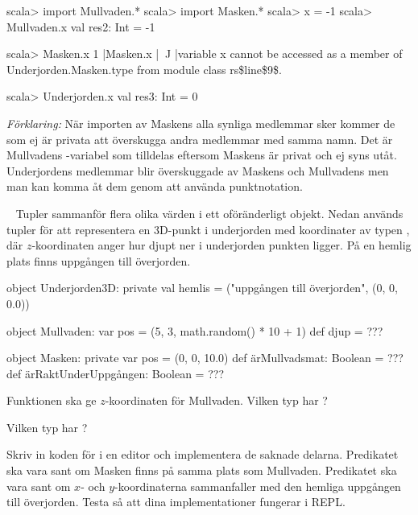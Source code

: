 \SubtaskSolved

\begin{REPL}
scala> import Mullvaden.*
scala> import Masken.*
scala> x = -1
scala> Mullvaden.x
val res2: Int = -1

scala> Masken.x
1 |Masken.x
  |^^^^^^^^
  |variable x cannot be accessed as a member of Underjorden.Masken.type from module class rs\$line\$9\$.

scala> Underjorden.x
val res3: Int = 0
\end{REPL}

\noindent \emph{Förklaring:} När importen av Maskens alla synliga medlemmar sker kommer de som ej är privata att överskugga andra medlemmar med samma namn. Det är Mullvadens -variabel som tilldelas  eftersom Maskens  är privat och ej syns utåt. Underjordens medlemmar blir överskuggade av Maskens  och Mullvadens  men man kan komma åt dem genom att använda punktnotation.

\QUESTEND





\QUESTBEGIN

\Task \what~ Tupler sammanför flera olika värden i ett oföränderligt objekt. Nedan används tupler för att representera en 3D-punkt i underjorden med koordinater  av typen , där $z$-koordinaten anger hur djupt ner i underjorden punkten ligger. På en hemlig plats finns uppgången till överjorden.

\begin{Code}
object Underjorden3D:
  private val hemlis = ("uppgången till överjorden", (0, 0, 0.0))

  object Mullvaden:
    var pos = (5, 3, math.random() * 10 + 1)
    def djup  = ???

  object Masken:
    private var pos = (0, 0, 10.0)
    def ärMullvadsmat: Boolean = ???
    def ärRaktUnderUppgången: Boolean = ???
\end{Code}

\Subtask Funktionen  ska ge $z$-koordinaten för Mullvaden. Vilken typ har ?

\Subtask Vilken typ har ?

\Subtask Skriv in koden för  i en editor och implementera de saknade delarna. Predikatet  ska vara sant om Masken finns på samma plats som Mullvaden. Predikatet   ska vara sant om $x$- och $y$-koordinaterna sammanfaller med den hemliga uppgången till överjorden. Testa så att dina implementationer fungerar i REPL.

